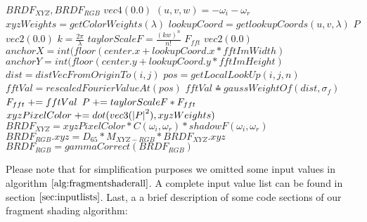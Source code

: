 \begin{algorithm}[H]
  \setlength{\fboxrule}{0pt} 
  \begin{boxedminipage}{1.0\textwidth}
  \begin{algorithmic}[1]
      \State \init $BRDF_{XYZ}, BRDF_{RGB}$ \myto $vec4(0.0)$
      \State $(u,v,w) = -\omega_i - \omega_r$
        \State $xyzWeights = getColorWeights(\lambda)$
        \State $lookupCoord = getlookupCoords(u, v, \lambda)$
        \State \init $P$ \myto $vec2(0.0)$
        \State $k = \frac{2\pi}{\lambda}$
          \State $taylorScaleF = \frac{(kw)^n}{n!}$
          \State \init $F_{fft}$  \myto $vec2(0.0)$
          \State $anchorX = int(floor(center.x + lookupCoord.x * fftImWidth)$
          \State $anchorY = int(floor(center.y + lookupCoord.y * fftImHeight)$
              \State $dist = distVecFromOriginTo(i,j)$
              \State $pos = getLocalLookUp(i,j,n)$
              \State $fftVal = rescaledFourierValueAt(pos)$
              \State $fftVal \asteq gaussWeightOf(dist, \sigma_f)$
              \State $F_{fft} \mathrel{+}= fftVal$
            \EndFor
          \EndFor
          \State $P \mathrel{+}= taylorScaleF*F_{fft}$
        \EndFor
        \State $xyzPixelColor \mathrel{+}= dot(vec3(\left|P\right|^2), xyzWeights)$
      \EndFor
      \State $BRDF_{XYZ} = xyzPixelColor*C(\omega_i, \omega_r)*shadowF(\omega_i, \omega_r)$
      \State $BRDF_{RGB}.xyz = D_{65}*M_{XYZ-RGB}*BRDF_{XYZ}.xyz$
      \State $BRDF_{RGB}= gammaCorrect(BRDF_{RGB})$
    \EndFor
  \end{algorithmic}
  \end{boxedminipage}
  \vskip1.5pt
  \label{alg:fragmentshaderall}
\end{algorithm}

Please note that for simplification purposes we omitted some input values in algorithm $\ref{alg:fragmentshaderall}$. A complete input value list can be found in section $\ref{sec:inputlists}$. Last, a a brief description of some code sections of our fragment shading algorithm:

